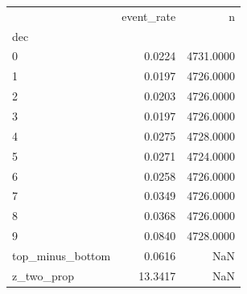 \begin{tabular}{lrr}
\toprule
 & event_rate & n \\
dec &  &  \\
\midrule
0 & 0.0224 & 4731.0000 \\
1 & 0.0197 & 4726.0000 \\
2 & 0.0203 & 4726.0000 \\
3 & 0.0197 & 4726.0000 \\
4 & 0.0275 & 4728.0000 \\
5 & 0.0271 & 4724.0000 \\
6 & 0.0258 & 4726.0000 \\
7 & 0.0349 & 4726.0000 \\
8 & 0.0368 & 4726.0000 \\
9 & 0.0840 & 4728.0000 \\
top_minus_bottom & 0.0616 & NaN \\
z_two_prop & 13.3417 & NaN \\
\bottomrule
\end{tabular}
